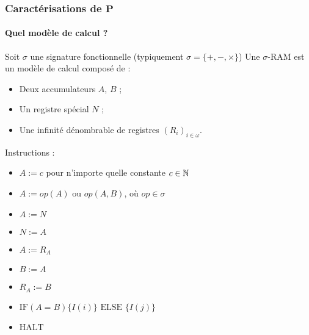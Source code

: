 \documentclass[10pt]{beamer}
\begin{document}
	
	
	
	\begin{frame}
		\frametitle{Caractérisations de $\textbf{P}$}
		\framesubtitle{Quel modèle de calcul ?}

		\begin{defn}
			Soit $\sigma$ une signature fonctionnelle (typiquement $\sigma = \{+, - , \times\}$)
			Une $\sigma$-RAM est un modèle de calcul composé de :
			
			\begin{itemize}[itemsep=-1mm]
				\item	Deux accumulateurs $A$, $B$ ;
				\item 	Un registre spécial $N$ ;
				\item 	Une infinité dénombrable de registres $\left( R_i\right)_{i \in \omega}$.
			\end{itemize}
			
			
			
			Instructions :
			
			\begin{itemize}[itemsep=-1mm]
				\item 	$A := c$ pour n'importe quelle constante $c \in \mathbb{N}$
				\item 	$A := op(A)$ ou $op(A,B)$, où $op \in \sigma$
				\item 	$A := N$ 
				\item 	$N := A$
				\item 	$A := R_A$
				\item 	$B := A$ 
				\item 	$R_A := B$
				\item 	$\text{IF} (A=B) \{I( i)\} \text{ ELSE } \{I( j )\}$
				\item 	$\text{HALT}$
			\end{itemize}	
		\end{defn}
		
	\end{frame}
	
\end{document}
